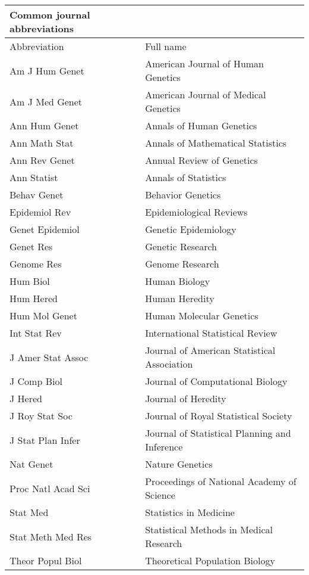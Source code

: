 \documentclass[11pt,a4paper]{iopthsis}
\begin{document}








\appendix



\nocite{*}



\newpage
\begin{tabular}{ll}
Common journal abbreviations \\
\hline
Abbreviation & Full name \\
\hline
Am J Hum Genet & American Journal of Human Genetics \\
Am J Med Genet & American Journal of Medical Genetics \\
Ann Hum Genet & Annals of Human Genetics \\
Ann Math Stat & Annals of Mathematical Statistics \\
Ann Rev Genet & Annual Review of Genetics \\
Ann Statist & Annals of Statistics \\
Behav Genet & Behavior Genetics \\
Epidemiol Rev & Epidemiological Reviews \\
Genet Epidemiol & Genetic Epidemiology \\
Genet Res & Genetic Research \\
Genome Res & Genome Research \\
Hum Biol & Human Biology \\
Hum Hered & Human Heredity \\
Hum Mol Genet & Human Molecular Genetics \\
Int Stat Rev & International Statistical Review \\
J Amer Stat Assoc & Journal of American Statistical Association \\
J Comp Biol & Journal of Computational Biology \\
J Hered & Journal of Heredity \\
J Roy Stat Soc & Journal of Royal Statistical Society \\
J Stat Plan Infer & Journal of Statistical Planning and Inference \\
Nat Genet & Nature Genetics \\
Proc Natl Acad Sci & Proceedings of National Academy of Science \\
Stat Med & Statistics in Medicine \\
Stat Meth Med Res & Statistical Methods in Medical Research \\
Theor Popul Biol & Theoretical Population Biology \\
\hline
\end{tabular}
\end{document}
